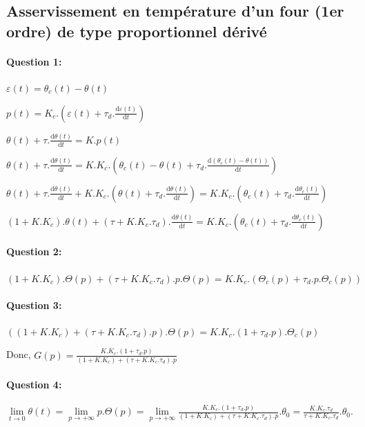 \subsection{Asservissement en température d'un four (1er ordre) de type proportionnel dérivé}

\paragraph{Question 1:}

$\varepsilon(t)=\theta_c(t)-\theta(t)$

$p(t)=K_c.\left(\varepsilon(t)+\tau_d.\frac{\mathrm{d}\varepsilon(t)}{\mathrm{d}t}\right)$

$\theta(t)+\tau.\frac{\mathrm{d}\theta(t)}{\mathrm{d}t}=K.p(t)$


$\theta(t)+\tau.\frac{\mathrm{d}\theta(t)}{\mathrm{d}t}=K.K_c.\left(\theta_c(t)-\theta(t)+\tau_d.\frac{\mathrm{d}\left(\theta_c(t)-\theta(t)\right)}{\mathrm{d}t}\right)$

$\theta(t)+\tau.\frac{\mathrm{d}\theta(t)}{\mathrm{d}t}+K.K_c.\left(\theta(t)+\tau_d.\frac{\mathrm{d}\theta(t)}{\mathrm{d}t}\right)=K.K_c.\left(\theta_c(t)+\tau_d.\frac{\mathrm{d}\theta_c(t)}{\mathrm{d}t}\right)$

$(1+K.K_c).\theta(t)+(\tau+K.K_c.\tau_d).\frac{\mathrm{d}\theta(t)}{\mathrm{d}t}=K.K_c.\left(\theta_c(t)+\tau_d.\frac{\mathrm{d}\theta_c(t)}{\mathrm{d}t}\right)$

\paragraph{Question 2:} 

$(1+K.K_c).\Theta(p)+(\tau+K.K_c.\tau_d).p.\Theta(p)=K.K_c.\left(\Theta_c(p)+\tau_d.p.\Theta_c(p)\right)$

\paragraph{Question 3:} 

$\left((1+K.K_c)+(\tau+K.K_c.\tau_d).p\right).\Theta(p)=K.K_c.\left(1+\tau_d.p\right).\Theta_c(p)$

Donc, $G(p)=\frac{K.K_c.\left(1+\tau_d.p\right)}{(1+K.K_c)+(\tau+K.K_c.\tau_d).p}$

\paragraph{Question 4:} $\lim\limits_{t\rightarrow 0}\theta(t)=\lim\limits_{p\rightarrow +\infty}p.\Theta(p)=\lim\limits_{p\rightarrow +\infty}\frac{K.K_c.\left(1+\tau_d.p\right)}{(1+K.K_c)+(\tau+K.K_c.\tau_d).p}.\theta_0=\frac{K.K_c.\tau_d}{\tau+K.K_c.\tau_d}.\theta_0$.

